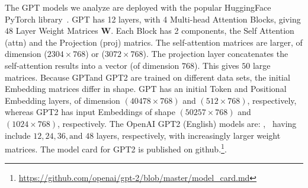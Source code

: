 The GPT models we analyze are deployed with the popular HuggingFace PyTorch library~\cite{XXX-XXX}.
GPT has 12 layers, with 4 Multi-head Attention Blocks, giving $48$ Layer Weight Matrices $\mathbf{W}$.
Each Block has 2 components, the Self Attention (attn) and the Projection (proj) matrics.  
The self-attention  matrices are larger, of dimension ($2304\times 768$) or ($3072\times 768$).
The projection layer concatenates the self-attention results into a vector (of dimension $768$).
This gives $50$ large matrices.
%
Because GPTand GPT2 are trained on different data sets, the initial Embedding matrices differ in shape.
GPT has an initial Token and Positional Embedding layers, of dimension $(40478\times 768)$ and $(512\times 768)$, respectively, whereas GPT2 has input Embeddings of shape $(50257\times 768)$ and $(1024\times 768)$, respectively. 
%
The OpenAI GPT2 (English) models are: , \
having include $12, 24, 36, \text{and }48$ layers, respectively, with increasingly larger weight matrices.
The model card for GPT2 is published on github.\footnote{\url{https://github.com/openai/gpt-2/blob/master/model_card.md}}.


